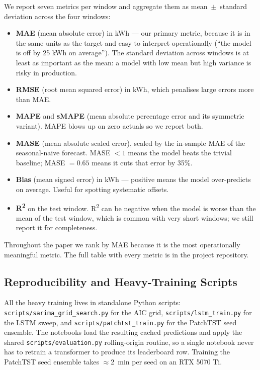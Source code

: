 We report seven metrics per window and aggregate them as
mean~$\pm$~standard deviation across the four windows:
\begin{itemize}[leftmargin=*]
    \item \textbf{MAE} (mean absolute error) in kWh --- our primary
    metric, because it is in the same units as the target and easy to
    interpret operationally (``the model is off by 25 kWh on
    average''). The standard deviation across windows is at least as
    important as the mean: a model with low mean but high variance is
    risky in production.
    \item \textbf{RMSE} (root mean squared error) in kWh, which
    penalises large errors more than MAE.
    \item \textbf{MAPE} and \textbf{sMAPE} (mean absolute percentage
    error and its symmetric variant). MAPE blows up on zero actuals
    so we report both.
    \item \textbf{MASE} (mean absolute scaled error), scaled by the
    in-sample MAE of the seasonal-naive forecast. MASE $< 1$ means
    the model beats the trivial baseline; MASE $= 0.65$ means it cuts
    that error by 35\%.
    \item \textbf{Bias} (mean signed error) in kWh --- positive means
    the model over-predicts on average. Useful for spotting
    systematic offsets.
    \item \textbf{R\textsuperscript{2}} on the test window. R\textsuperscript{2}
    can be negative when the model is worse than the mean of the
    test window, which is common with very short windows; we still
    report it for completeness.
\end{itemize}
Throughout the paper we rank by MAE because it is the most operationally
meaningful metric. The full table with every metric is in the project
repository.

\subsection{Reproducibility and Heavy-Training Scripts}

All the heavy training lives in standalone Python scripts:
\texttt{scripts/sarima\_grid\_search.py} for the AIC grid,
\texttt{scripts/lstm\_train.py} for the LSTM sweep, and
\texttt{scripts/patchtst\_train.py} for the PatchTST seed ensemble.
The notebooks load the resulting cached predictions and apply the
shared \texttt{scripts/evaluation.py} rolling-origin routine, so a
single notebook never has to retrain a transformer to produce its
leaderboard row. Training the PatchTST seed ensemble takes
$\approx$2~min per seed on an RTX 5070 Ti.
